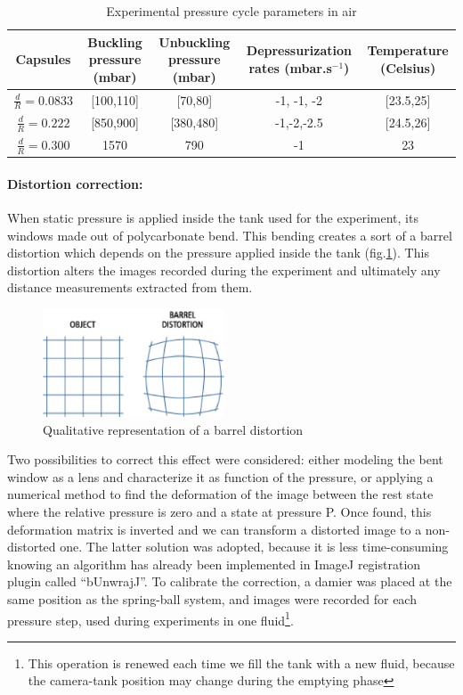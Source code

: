 \begin{table}[H]
	\centering
		\begin{adjustbox}{width=\textwidth}
			\begin{tabular}{|c|c|c|c|c|}
				\hline
				Capsules & Buckling pressure (mbar) & Unbuckling pressure (mbar) & Depressurization rates (mbar.s$^{-1}$) & Temperature (Celsius) \\
				\hline
				$\frac{d}{R} = 0.0833 $ & [100,110]& [70,80] & -1, -1, -2 & [23.5,25]\\
				$\frac{d}{R} = 0.222 $ & [850,900] & [380,480] & -1,-2,-2.5 & [24.5,26]\\
				$\frac{d}{R} = 0.300 $ & 1570 & 790 & -1 & 23 \\
				\hline
			\end{tabular}
		\end{adjustbox}
	\caption{Experimental pressure cycle parameters in air}
	\label{tab:Experimental_pressure_cycle_parameters_in_air}
\end{table}


\paragraph{Distortion correction:}
When static pressure is applied inside the tank used for the experiment, its windows made out of polycarbonate bend. This bending creates a sort of a barrel distortion which depends on the pressure applied inside the tank (fig.\ref{fig:barrel_distortion}). This distortion alters the images recorded during the experiment and ultimately any distance measurements extracted from them.
\begin{figure}[H] %
	\centering%
  \includegraphics[width=0.48\textwidth]{figures/Chapter_1/barrel_effect.png}
	\caption{Qualitative representation of a barrel distortion}
	\label{fig:barrel_distortion}
\end{figure}
 Two possibilities to correct this effect were considered: either modeling the bent window as a lens and characterize it as function of the pressure, or applying a numerical method to find the deformation of the image between the rest state where the relative pressure is zero and a state at pressure P. Once found, this deformation matrix is inverted and we can transform a distorted image to a non-distorted one. The latter solution was adopted, because it is less time-consuming knowing an algorithm has already been implemented in ImageJ registration plugin called "`bUnwrajJ"'.
To calibrate the correction, a damier was placed at the same position as the spring-ball system, and images were recorded for each pressure step, used during experiments in one fluid\footnote{This operation is renewed each time we fill the tank with a new fluid, because the camera-tank position may change during the emptying phase}.




